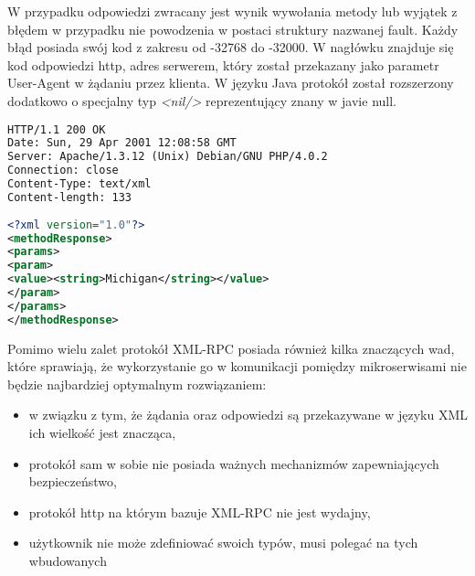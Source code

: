 W przypadku odpowiedzi zwracany jest wynik wywołania metody lub wyjątek z błędem w przypadku nie powodzenia w postaci struktury nazwanej fault. Każdy błąd posiada swój kod z zakresu od -32768 do -32000. W nagłówku znajduje się kod odpowiedzi http, adres serwerem, który został przekazany jako parametr  User-Agent w żądaniu przez klienta. W języku Java protokół został rozszerzony dodatkowo o specjalny typ \textit{<nil/>} reprezentujący znany w javie null.

\begin{lstlisting}[language=XML, caption=Przykład odpowiedzi serwera]
HTTP/1.1 200 OK   
Date: Sun, 29 Apr 2001 12:08:58 GMT
Server: Apache/1.3.12 (Unix) Debian/GNU PHP/4.0.2  
Connection: close  
Content-Type: text/xml  
Content-length: 133  
 
<?xml version="1.0"?> 
<methodResponse> 
<params> 
<param> 
<value><string>Michigan</string></value> 
</param> 
</params> 
</methodResponse> 
\end{lstlisting}
\noindent
Pomimo wielu zalet protokół XML-RPC posiada również kilka znaczących wad, które sprawiają, że wykorzystanie go w komunikacji pomiędzy mikroserwisami nie będzie najbardziej optymalnym rozwiązaniem:
\begin{itemize}
  \item w związku z tym, że żądania oraz odpowiedzi są przekazywane w języku XML ich wielkość jest znacząca,
  \item protokół sam w sobie nie posiada ważnych mechanizmów zapewniających bezpieczeństwo,
  \item protokół http na którym bazuje XML-RPC nie jest wydajny,
  \item użytkownik nie może zdefiniować swoich typów, musi polegać na tych wbudowanych
\end{itemize}
